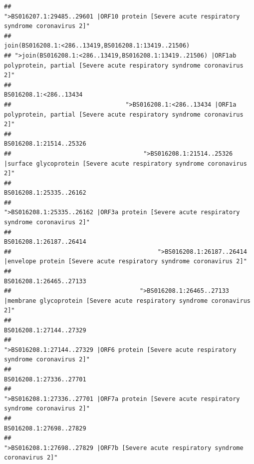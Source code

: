 \documentclass[
]{article}
\begin{document}
\begin{verbatim}
##                                            ">BS016207.1:29485..29601 |ORF10 protein [Severe acute respiratory syndrome coronavirus 2]" 
##                                                                                   join(BS016208.1:<286..13419,BS016208.1:13419..21506) 
## ">join(BS016208.1:<286..13419,BS016208.1:13419..21506) |ORF1ab polyprotein, partial [Severe acute respiratory syndrome coronavirus 2]" 
##                                                                                                                 BS016208.1:<286..13434 
##                                ">BS016208.1:<286..13434 |ORF1a polyprotein, partial [Severe acute respiratory syndrome coronavirus 2]" 
##                                                                                                                BS016208.1:21514..25326 
##                                     ">BS016208.1:21514..25326 |surface glycoprotein [Severe acute respiratory syndrome coronavirus 2]" 
##                                                                                                                BS016208.1:25335..26162 
##                                            ">BS016208.1:25335..26162 |ORF3a protein [Severe acute respiratory syndrome coronavirus 2]" 
##                                                                                                                BS016208.1:26187..26414 
##                                         ">BS016208.1:26187..26414 |envelope protein [Severe acute respiratory syndrome coronavirus 2]" 
##                                                                                                                BS016208.1:26465..27133 
##                                    ">BS016208.1:26465..27133 |membrane glycoprotein [Severe acute respiratory syndrome coronavirus 2]" 
##                                                                                                                BS016208.1:27144..27329 
##                                             ">BS016208.1:27144..27329 |ORF6 protein [Severe acute respiratory syndrome coronavirus 2]" 
##                                                                                                                BS016208.1:27336..27701 
##                                            ">BS016208.1:27336..27701 |ORF7a protein [Severe acute respiratory syndrome coronavirus 2]" 
##                                                                                                                BS016208.1:27698..27829 
##                                                    ">BS016208.1:27698..27829 |ORF7b [Severe acute respiratory syndrome coronavirus 2]" 

\end{verbatim}
\end{document}
